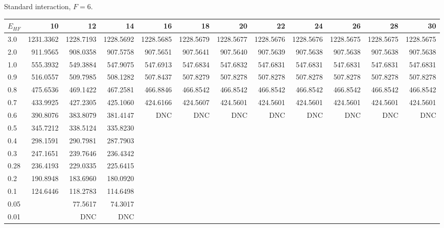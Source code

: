 \begin{landscape}
\begin{table}
\begin{small}
\begin{center}
Standard interaction, $F=6$.\\
\begin{tabular}{l|rrrrrrrrrrr}
\hline 
$E_{HF}$ & 10 & 12 & 14 & 16 & 18 & 20 & 22 & 24 & 26 & 28 & 30 \\
\hline \hline
3.0 & 1231.3362 & 1228.7193 & 1228.5692 & 1228.5685 & 1228.5679 & 1228.5677 & 1228.5676 &  1228.5676 & 1228.5675 & 1228.5675 & 1228.5675  \\ 
2.0 &  911.9565 &  908.0358 &  907.5758 &  907.5651 &  907.5641 &  907.5640 &  907.5639 &   907.5638 &  907.5638 &  907.5638 &  907.5638  \\ 
1.0 &  555.3932 &  549.3884 &  547.9075 &  547.6913 &  547.6834 &  547.6832 &  547.6831 &   547.6831 &  547.6831 &  547.6831 &  547.6831  \\ 
0.9 &  516.0557 &  509.7985 &  508.1282 &  507.8437 &  507.8279 &  507.8278 &  507.8278 &   507.8278 &  507.8278 &  507.8278 &  507.8278  \\ 
0.8 &  475.6536 &  469.1422 &  467.2581 &  466.8846 &  466.8542 &  466.8542 &  466.8542 &   466.8542 &  466.8542 &  466.8542 &  466.8542  \\ 
0.7 &  433.9925 &  427.2305 &  425.1060 &  424.6166 &  424.5607 &  424.5601 &  424.5601 &   424.5601 &  424.5601 &  424.5601 &  424.5601  \\ 
0.6 &  390.8076 &  383.8079 &  381.4147 &       DNC &       DNC &       DNC &      DNC  &      DNC   &       DNC &       DNC &       DNC  \\ 
0.5 & 345.7212 & 338.5124 & 335.8230  \\ 
0.4 & 298.1591 & 290.7981 & 287.7903  \\ 
0.3 & 247.1651 & 239.7646 & 236.4342  \\ 
0.28 & 236.4193 & 229.0335 & 225.6415  \\ 
0.2 & 190.8948 & 183.6960 & 180.0920  \\ 
0.1 & 124.6446 & 118.2783 & 114.6498  \\ 
0.05 &         & 77.5617 & 74.3017  \\ 
0.01 &         & DNC & DNC  \\ 
\hline \hline
\end{tabular}
\end{center}
\end{small}
\end{table}

\end{landscape}
